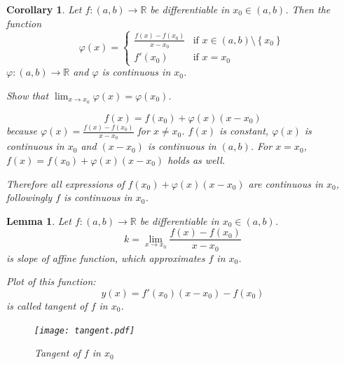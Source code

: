 \documentclass[a4paper,landscape,twocolumn]{article}
\newtheorem{cor}{Corollary}
\newtheorem{lemma}{Lemma}
\newcommand\set[1]{\left\{#1\right\}}
\begin{document}
%
\begin{cor}
  Let $f: (a, b) \to \mathbb R$ be differentiable in $x_0 \in (a, b)$. Then
  the function
  \[
    \varphi(x) = \begin{cases}
      \frac{f(x) - f(x_0)}{x - x_0} & \text{if } x \in (a, b) \setminus \set{x_0} \\
      f'(x_0) & \text{if } x = x_0
    \end{cases}
  \]
  $\varphi: (a,b) \to \mathbb R$ and $\varphi$ is continuous in $x_0$.

  Show that $\lim_{x\to x_0} \varphi(x) = \varphi(x_0)$.

  \[ f(x) = f(x_0) + \varphi(x)(x - x_0) \]
  because $\varphi(x) = \frac{f(x) - f(x_0)}{x - x_0}$ for $x \neq x_0$.
  $f(x)$ is constant, $\varphi(x)$ is continuous in $x_0$ and $(x - x_0)$ is continuous in $(a, b)$.
  For $x = x_0$, $f(x) = f(x_0) + \varphi(x)(x - x_0)$ holds as well.

  Therefore all expressions of $f(x_0) + \varphi(x)(x - x_0)$ are continuous in $x_0$,
  followingly $f$ is continuous in $x_0$.
\end{cor}
\begin{lemma}
  Let $f: (a, b) \to \mathbb R$ be differentiable in $x_0 \in (a, b)$.
  \[ k = \lim_{x \to x_0} \frac{f(x) - f(x_0)}{x - x_0} \]
  is slope of affine function, which approximates $f$ in $x_0$.

  Plot of this function:
  \[ y(x) = f'(x_0) (x - x_0) - f(x_0) \]
  is called \emph{tangent} of $f$ in $x_0$.

  \begin{figure}[t]
    \begin{center}
      \texttt{[image: tangent.pdf]}
      \caption{Tangent of $f$ in $x_0$}
    \end{center}
  \end{figure}
\end{lemma}


\clearpage
\begin{otherlanguage}{ngerman}
\printindex[German]
\end{otherlanguage}
\printindex[English]
\end{document}
